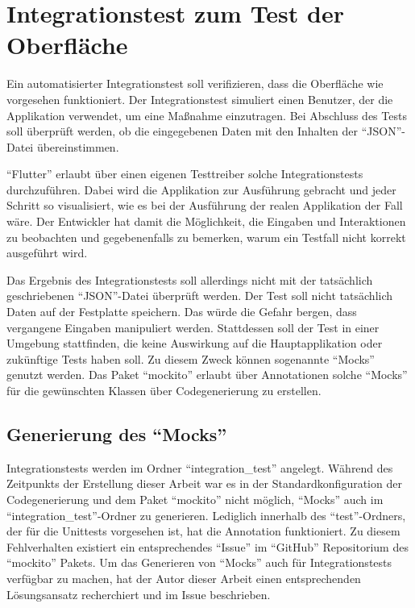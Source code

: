 \ifodd\value{page}\hbox{}\newpage\fi
\section{Integrationstest zum Test der Oberfläche}
\label{sec:Integrations}

Ein automatisierter Integrationstest soll verifizieren, dass die Oberfläche wie vorgesehen funktioniert.
Der Integrationstest simuliert einen Benutzer, der die Applikation verwendet, um eine Maßnahme einzutragen.
Bei Abschluss des Tests soll überprüft werden, ob die  eingegebenen Daten mit den Inhalten der \enquote{JSON}-Datei übereinstimmen.

\enquote{Flutter} erlaubt über einen eigenen Testtreiber solche Integrationstests durchzuführen.
Dabei wird die Applikation zur Ausführung gebracht und jeder Schritt so visualisiert, wie es bei der Ausführung der realen Applikation der Fall wäre.
Der Entwickler hat damit die Möglichkeit, die Eingaben und Interaktionen zu beobachten und gegebenenfalls zu bemerken, warum ein Testfall nicht korrekt ausgeführt wird.

Das Ergebnis des Integrationstests soll allerdings nicht mit der tatsächlich geschriebenen \enquote{JSON}-Datei überprüft werden.
Der Test soll nicht tatsächlich Daten auf der Festplatte speichern.
Das würde die Gefahr bergen, dass vergangene Eingaben manipuliert werden.
Stattdessen soll der Test in einer Umgebung stattfinden, die keine Auswirkung auf die Hauptapplikation oder zukünftige Tests haben soll.
Zu diesem Zweck können sogenannte \enquote{Mocks} genutzt werden.
Das Paket \enquote{mockito} erlaubt über Annotationen solche \enquote{Mocks} für die gewünschten Klassen  über Codegenerierung zu erstellen.

\subsection{Generierung des \enquote{Mocks} }
\label{sec:GenerierungDesMocks}

Integrationstests werden im Ordner \enquote{integration_test} angelegt.
Während des Zeitpunkts der Erstellung dieser Arbeit war es in der Standardkonfiguration der Codegenerierung und dem Paket \enquote{mockito} nicht möglich, \enquote{Mocks} auch im \enquote{integration_test}-Ordner zu generieren.
Lediglich innerhalb des \enquote{test}-Ordners, der für die Unittests vorgesehen ist, hat die Annotation  funktioniert.
Zu diesem Fehlverhalten existiert ein entsprechendes \enquote{Issue} im \enquote{GitHub} Repositorium  des \enquote{mockito} Pakets.
 Um das Generieren von \enquote{Mocks} auch für Integrationstests verfügbar zu machen,
hat der Autor dieser Arbeit einen entsprechenden Lösungsansatz recherchiert und im Issue beschrieben. 

